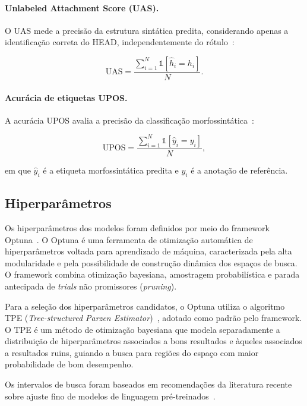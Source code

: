 \paragraph{Unlabeled Attachment Score (UAS).}
O UAS mede a precisão da estrutura sintática predita, considerando apenas a identificação
correta do HEAD, independentemente do rótulo~\citep{chen2008dependency}:

\[
\text{UAS} =
\frac{
\sum_{i=1}^{N}
\mathbb{1}
[\hat{h}_i = h_i]
}
{N}.
\]

\paragraph{Acurácia de etiquetas UPOS.}
A acurácia UPOS avalia a precisão da classificação morfossintática~\citep{paul2023bengali}:

\[
\text{UPOS} =
\frac{
\sum_{i=1}^{N}
\mathbb{1}
[\hat{y}_i = y_i]
}
{N},
\]

em que $\hat{y}_i$ é a etiqueta morfossintática predita e $y_i$ é a anotação de referência.

\subsection*{Hiperparâmetros}

Os hiperparâmetros dos modelos foram definidos por meio do framework Optuna~\citep{akiba2019optuna}.
O Optuna é uma ferramenta de otimização automática de hiperparâmetros voltada para aprendizado
de máquina, caracterizada pela alta modularidade e pela possibilidade de construção dinâmica
dos espaços de busca. O framework combina otimização bayesiana, amostragem probabilística e
parada antecipada de \textit{trials} não promissores (\textit{pruning}).

Para a seleção dos hiperparâmetros candidatos, o Optuna utiliza o algoritmo TPE
(\textit{Tree-structured Parzen Estimator})~\citep{bergstra2011algorithms}, adotado como
padrão pelo framework. O TPE é um método de otimização bayesiana que modela separadamente
a distribuição de hiperparâmetros associados a bons resultados e àqueles associados a
resultados ruins, guiando a busca para regiões do espaço com maior probabilidade de bom
desempenho.

Os intervalos de busca foram baseados em recomendações da literatura recente sobre ajuste
fino de modelos de linguagem pré-treinados~\citep{halfon2024staytunedempiricalstudy,
gupta2023continualpretraininglargelanguage,ibrahim2024simplescalablestrategiescontinually,
pareja2024unveilingsecretrecipeguide}.

